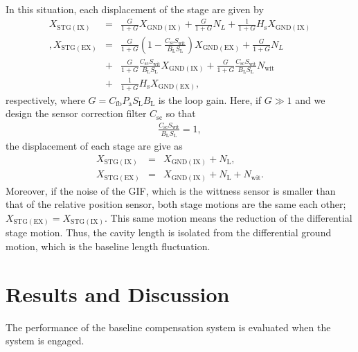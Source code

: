 In this situation, each displacement of the stage are given by 
\begin{eqnarray}
  X_{\mathrm{STG(IX)}} &=& \displaystyle\frac{G}{1+G} X_{\mathrm{GND(IX)}} + \frac{G}{1+G} N_{L} + \frac{1}{1+G} H_{\mathrm{s}} X_{\mathrm{GND(IX)}} \\ \nonumber,
  X_{\mathrm{STG(EX)}} &=& \displaystyle\frac{G}{1+G} \left(1- \frac{C_{\mathrm{sc}}S_{\mathrm{wit}}}{B_{\mathrm{L}}S_{\mathrm{L}}}\right) X_{\mathrm{GND(EX)}} + \frac{G}{1+G}N_{L} \\ \nonumber
  &+& \frac{G}{1+G} \frac{C_{\mathrm{sc}}S_{\mathrm{wit}}} {B_{\mathrm{L}}S_{\mathrm{L}}} X_{\mathrm{GND(IX)}}
  + \frac{G}{1+G} \frac{C_{\mathrm{sc}}S_{\mathrm{wit}}} {B_{\mathrm{L}}S_{\mathrm{L}}} N_{\mathrm{wit}}\\ 
  &+& \frac{1}{1+G} H_{\mathrm{s}} X_{\mathrm{GND(EX)}},
\end{eqnarray}
respectively, where $G=C_{\mathrm{fb}}P_{\mathrm{a}}S_{\mathrm{L}}B_{\mathrm{L}}$ is the loop gain. Here, if $G\gg1$ and we design the sensor correction filter $C_{\mathrm{sc}}$ so that
\begin{eqnarray}
  \frac{C_{\mathrm{sc}}S_{\mathrm{wit}}}{B_{\mathrm{L}}S_{\mathrm{L}}} = 1,
\end{eqnarray}
the displacement of each stage are give as 
\begin{eqnarray}
  X_{\mathrm{STG(IX)}} &=& X_{\mathrm{GND(IX)}} + N_{\mathrm{L}},\\
  X_{\mathrm{STG(EX)}} &=& X_{\mathrm{GND(IX)}} + N_{\mathrm{L}} + N_{\mathrm{wit}}.
\end{eqnarray}
Moreover, if the noise of the GIF, which is the wittness sensor is smaller than that of the relative position sensor, both stage motions are the same each other; $X_{\mathrm{STG(EX)}}=X_{\mathrm{STG(IX)}}$. This same motion means the reduction of the differential stage motion. Thus, the cavity length is isolated from the differential ground motion, which is the baseline length fluctuation.




\section{Results and Discussion } \label{sec:sec52}
The performance of the baseline compensation system is evaluated when the system is engaged.

